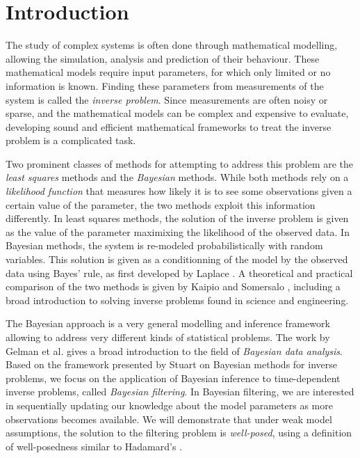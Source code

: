 \section{Introduction}
\setcounter{page}{1}
\thispagestyle{empty}

The study of complex systems is often done through mathematical modelling, allowing the simulation, analysis and prediction of their behaviour. These mathematical models require input parameters, for which only limited or no information is known. Finding these parameters from measurements of the system is called the \textit{inverse problem}. Since measurements are often noisy or sparse, and the mathematical models can be complex and expensive to evaluate, developing sound and efficient mathematical frameworks to treat the inverse problem is a complicated task.

Two prominent classes of methods for attempting to address this problem are the \textit{least squares} methods and the \textit{Bayesian} methods. While both methods rely on a \textit{likelihood function} that measures how likely it is to see some observations given a certain value of the parameter, the two methods exploit this information differently. In least squares methods, the solution of the inverse problem is given as the value of the parameter maximixing the likelihood of the observed data. In Bayesian methods, the system is re-modeled probabilistically with random variables. This solution is given as a conditionning of the model by the observed data using Bayes' rule, as first developed by Laplace \cite{laplace1820theorie}. A theoretical and practical comparison of the two methods is given by Kaipio and Somersalo \cite{kaipio2006statistical}, including a broad introduction to solving inverse problems found in science and engineering. 

The Bayesian approach is a very general modelling and inference framework allowing to address very different kinds of statistical problems. The work by Gelman et al. \cite{gelman} gives a broad introduction to the field of \textit{Bayesian data analysis}. Based on the framework presented by Stuart \cite{stuart_2010} on Bayesian methods for inverse problems, we focus on the application of Bayesian inference to time-dependent inverse problems, called \textit{Bayesian filtering}. In Bayesian filtering, we are interested in sequentially updating our knowledge about the model parameters as more observations becomes available. We will demonstrate that under weak model assumptions, the solution to the filtering problem is \textit{well-posed}, using a definition of well-posedness similar to Hadamard's \cite{hadamard}.

